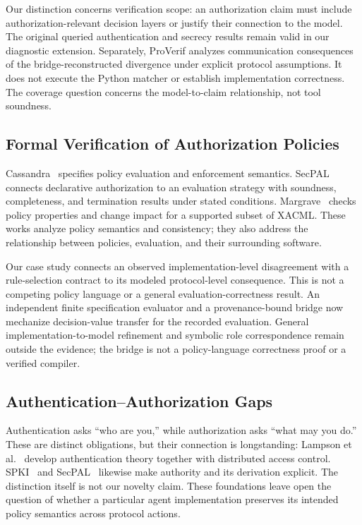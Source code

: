Our distinction concerns verification scope: an authorization claim must
include authorization-relevant decision layers or justify their connection
to the model. The original queried authentication and secrecy results remain
valid in our diagnostic extension. Separately, ProVerif analyzes communication
consequences of the bridge-reconstructed divergence under explicit protocol
assumptions. It does not
execute the Python matcher or establish implementation correctness. The
coverage question concerns the model-to-claim relationship, not tool soundness.

\subsection{Formal Verification of Authorization Policies}

Cassandra~\cite{becker2004cassandra} specifies policy evaluation and
enforcement semantics. SecPAL~\cite{becker2007secpal} connects declarative
authorization to an evaluation strategy with soundness, completeness, and
termination results under stated conditions. Margrave~\cite{fisler2005margrave}
checks policy properties and change impact for a supported subset of XACML.
These works analyze policy semantics and consistency; they also address the
relationship between policies, evaluation, and their surrounding software.

Our case study connects an observed implementation-level disagreement with a
rule-selection contract to its modeled protocol-level consequence. This is
not a competing policy language or a general evaluation-correctness result.
An independent finite specification evaluator and a provenance-bound bridge
now mechanize decision-value transfer for the recorded evaluation. General
implementation-to-model refinement and symbolic role correspondence remain
outside the evidence; the bridge is not a policy-language correctness proof
or a verified compiler.

\subsection{Authentication--Authorization Gaps}

Authentication asks ``who are you,'' while authorization asks ``what may you
do.'' These are distinct obligations, but their connection is longstanding:
Lampson et al.~\cite{lampson1992authentication} develop authentication theory
together with distributed access control. SPKI~\cite{ellison1999spki} and
SecPAL~\cite{becker2007secpal} likewise make authority and its derivation
explicit. The distinction itself is not our novelty claim. These foundations
leave open the question of whether a particular agent implementation preserves
its intended policy semantics across protocol actions.

